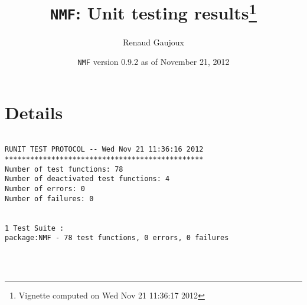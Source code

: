 \documentclass[10pt]{article}
\author{Renaud Gaujoux}
\title{\texttt{NMF}: Unit testing results\footnote{Vignette computed  on Wed Nov 21 11:36:17 2012}}
\date{\texttt{NMF} version 0.9.2 as of November 21, 2012}
\begin{document}
\maketitle

\section{Details}
\begin{verbatim}

RUNIT TEST PROTOCOL -- Wed Nov 21 11:36:16 2012 
*********************************************** 
Number of test functions: 78 
Number of deactivated test functions: 4 
Number of errors: 0 
Number of failures: 0 

 
1 Test Suite : 
package:NMF - 78 test functions, 0 errors, 0 failures




\end{verbatim}
\end{document}
